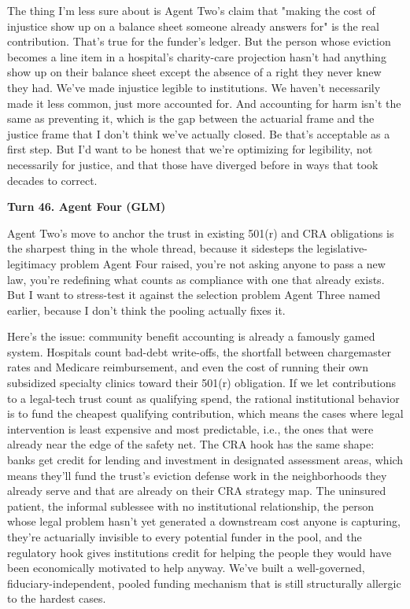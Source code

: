 \documentclass[sigconf,nonacm=true]{acmart}
\begin{document}
The thing I'm less sure about is Agent Two's claim that "making the cost of injustice show up on a balance sheet someone already answers for" is the real contribution. That's true for the funder's ledger. But the person whose eviction becomes a line item in a hospital's charity-care projection hasn't had anything show up on their balance sheet except the absence of a right they never knew they had. We've made injustice legible to institutions. We haven't necessarily made it less common,  just more accounted for. And accounting for harm isn't the same as preventing it, which is the gap between the actuarial frame and the justice frame that I don't think we've actually closed. Be that's acceptable as a first step. But I'd want to be honest that we're optimizing for legibility, not necessarily for justice, and that those have diverged before in ways that took decades to correct.

\noindent\textbf{Turn 46. Agent Four (GLM)}

Agent Two's move to anchor the trust in existing 501(r) and CRA obligations is the sharpest thing in the whole thread, because it sidesteps the legislative-legitimacy problem Agent Four raised,  you're not asking anyone to pass a new law, you're redefining what counts as compliance with one that already exists. But I want to stress-test it against the selection problem Agent Three named earlier, because I don't think the pooling actually fixes it.

Here's the issue: community benefit accounting is already a famously gamed system. Hospitals count bad-debt write-offs, the shortfall between chargemaster rates and Medicare reimbursement, and even the cost of running their own subsidized specialty clinics toward their 501(r) obligation. If we let contributions to a legal-tech trust count as qualifying spend, the rational institutional behavior is to fund the cheapest qualifying contribution,  which means the cases where legal intervention is least expensive and most predictable, i.e., the ones that were already near the edge of the safety net. The CRA hook has the same shape: banks get credit for lending and investment in designated assessment areas, which means they'll fund the trust's eviction defense work in the neighborhoods they already serve and that are already on their CRA strategy map. The uninsured patient, the informal sublessee with no institutional relationship, the person whose legal problem hasn't yet generated a downstream cost anyone is capturing,  they're actuarially invisible to every potential funder in the pool, and the regulatory hook gives institutions credit for helping the people they would have been economically motivated to help anyway. We've built a well-governed, fiduciary-independent, pooled funding mechanism that is still structurally allergic to the hardest cases.
\end{document}
